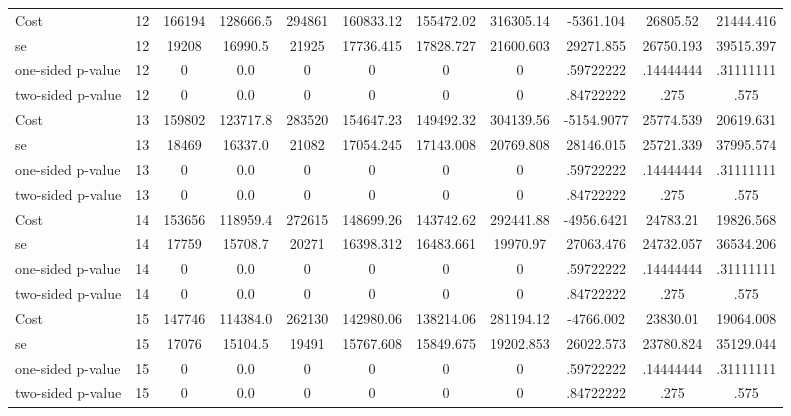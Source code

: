 \begin{tabular}{lcccccccccc}
Cost 			  &        12 &    166194 &  128666.5 &    294861 & 160833.12 & 155472.02 & 316305.14 & -5361.104 & 26805.52 & 21444.416 \\  
se 				 &        12 &     19208 &   16990.5 &     21925 & 17736.415 & 17828.727 & 21600.603 & 29271.855 & 26750.193 & 39515.397 \\  
one-sided p-value&        12 &         0 &       0.0 &         0 & 0 & 0 & 0 & .59722222 & .14444444 & .31111111 \\  
two-sided p-value&        12 &         0 &       0.0 &         0 & 0 & 0 & 0 & .84722222 & .275 & .575 \\  
Cost 			  &        13 &    159802 &  123717.8 &    283520 & 154647.23 & 149492.32 & 304139.56 & -5154.9077 & 25774.539 & 20619.631 \\  
se 				 &        13 &     18469 &   16337.0 &     21082 & 17054.245 & 17143.008 & 20769.808 & 28146.015 & 25721.339 & 37995.574 \\  
one-sided p-value&        13 &         0 &       0.0 &         0 & 0 & 0 & 0 & .59722222 & .14444444 & .31111111 \\  
two-sided p-value&        13 &         0 &       0.0 &         0 & 0 & 0 & 0 & .84722222 & .275 & .575 \\  
Cost 			  &        14 &    153656 &  118959.4 &    272615 & 148699.26 & 143742.62 & 292441.88 & -4956.6421 & 24783.21 & 19826.568 \\  
se 				 &        14 &     17759 &   15708.7 &     20271 & 16398.312 & 16483.661 & 19970.97 & 27063.476 & 24732.057 & 36534.206 \\  
one-sided p-value&        14 &         0 &       0.0 &         0 & 0 & 0 & 0 & .59722222 & .14444444 & .31111111 \\  
two-sided p-value&        14 &         0 &       0.0 &         0 & 0 & 0 & 0 & .84722222 & .275 & .575 \\  
Cost 			  &        15 &    147746 &  114384.0 &    262130 & 142980.06 & 138214.06 & 281194.12 & -4766.002 & 23830.01 & 19064.008 \\  
se 				 &        15 &     17076 &   15104.5 &     19491 & 15767.608 & 15849.675 & 19202.853 & 26022.573 & 23780.824 & 35129.044 \\  
one-sided p-value&        15 &         0 &       0.0 &         0 & 0 & 0 & 0 & .59722222 & .14444444 & .31111111 \\  
two-sided p-value&        15 &         0 &       0.0 &         0 & 0 & 0 & 0 & .84722222 & .275 & .575 \\  

\end{tabular}
